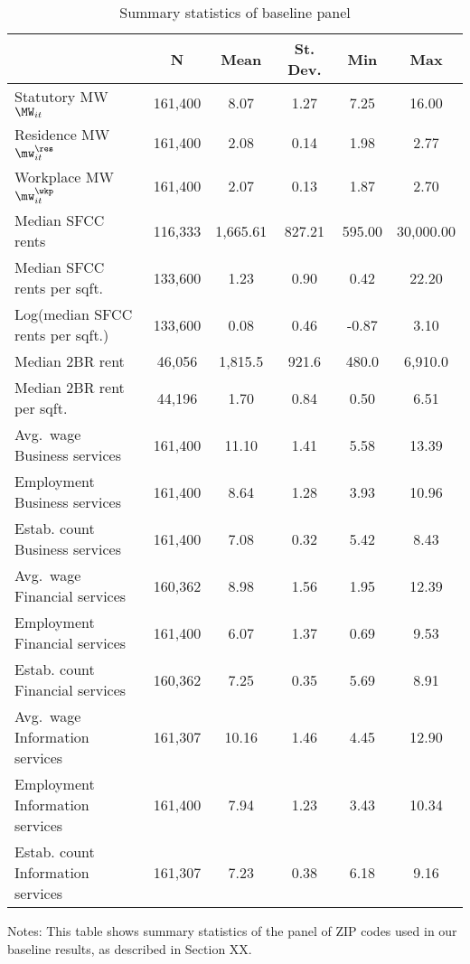 \begin{table}[hbt!] \centering
    \caption{Summary statistics of baseline panel}
    \label{tab:stats_est_panel}
    \begin{tabular}{@{}lccccc@{}}
        \toprule
                                          & \multicolumn{1}{c}{N} 
                                          & \multicolumn{1}{c}{Mean} 
                                          & \multicolumn{1}{c}{St. Dev.} 
                                          & \multicolumn{1}{c}{Min} 
                                          & \multicolumn{1}{c}{Max}                 \\ \midrule
        Statutory MW $\MW_{it}$           & 161,400  & 8.07  & 1.27  & 7.25  & 16.00  \\
        Residence MW $\mw^{\res}_{it}$    & 161,400  & 2.08  & 0.14  & 1.98  & 2.77  \\
        Workplace MW $\mw^{\wkp}_{it}$    & 161,400  & 2.07  & 0.13  & 1.87  & 2.70  \\
        Median SFCC rents                 & 116,333  & 1,665.61  & 827.21  & 595.00  & 30,000.00  \\
        Median SFCC rents per sqft.       & 133,600  & 1.23  & 0.90  & 0.42  & 22.20  \\
        Log(median SFCC rents per sqft.)  & 133,600  & 0.08  & 0.46  & -0.87  & 3.10  \\
        Median 2BR rent                   & 46,056   & 1,815.5 & 921.6 & 480.0 & 6,910.0  \\
        Median 2BR rent per sqft.         & 44,196   & 1.70  & 0.84  & 0.50  & 6.51  \\
        Avg.\ wage Business services      & 161,400  & 11.10  & 1.41  & 5.58  & 13.39  \\
        Employment Business services      & 161,400  & 8.64  & 1.28  & 3.93  & 10.96  \\
        Estab. count Business services    & 161,400  & 7.08  & 0.32  & 5.42  & 8.43  \\
        Avg.\ wage Financial services     & 160,362  & 8.98  & 1.56  & 1.95  & 12.39  \\
        Employment Financial services     & 161,400  & 6.07  & 1.37  & 0.69  & 9.53  \\
        Estab. count Financial services   & 160,362  & 7.25  & 0.35  & 5.69  & 8.91  \\
        Avg.\ wage Information services   & 161,307  & 10.16  & 1.46  & 4.45  & 12.90  \\
        Employment Information services   & 161,400  & 7.94  & 1.23  & 3.43  & 10.34  \\
        Estab. count Information services & 161,307  & 7.23  & 0.38  & 6.18  & 9.16  \\ \bottomrule
    \end{tabular}

    \begin{minipage}{.95\textwidth} \footnotesize
        \vspace{2mm}
        Notes: This table shows summary statistics of the panel of ZIP codes 
        used in our baseline results, as described in Section XX.
    \end{minipage}
\end{table}
